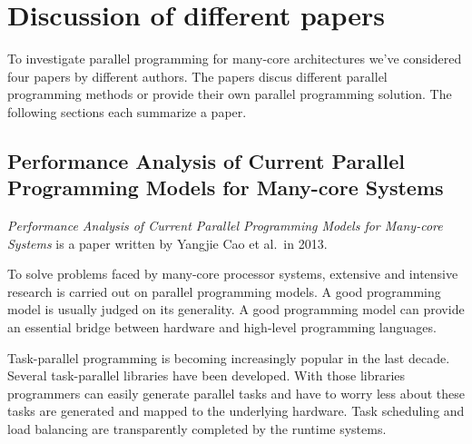 \section{Discussion of different papers} \label{papers}

To investigate parallel programming for many-core architectures we've
considered four papers by different authors. The papers discus different
parallel programming methods or provide their own parallel programming
solution. The following sections each summarize a paper.

\subsection{Performance Analysis of Current Parallel Programming Models for Many-core Systems}

\emph{Performance Analysis of Current Parallel Programming Models for Many-core
Systems} \cite{CaoPerformanceAnalysis} is a paper written by Yangjie Cao et
al.\ in 2013.

%

To solve problems faced by many-core processor systems, extensive and intensive
research is carried out on parallel programming models. A good programming
model is usually judged on its generality. A good programming model can provide
an essential bridge between hardware and high-level programming languages.


Task-parallel programming is becoming increasingly popular in the last decade.
Several task-parallel libraries have been developed. With those libraries
programmers can easily generate parallel tasks and have to worry less about
these tasks are generated and mapped to the underlying hardware. Task
scheduling and load balancing are transparently completed by the runtime
systems.

